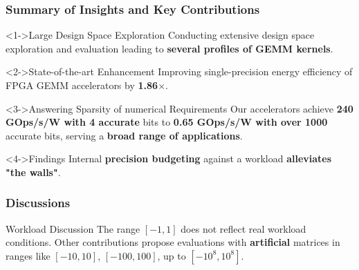 \begin{frame}
    \frametitle{Summary of Insights and Key Contributions}
        \begin{alertblock}<1->{Large Design Space Exploration}
		Conducting extensive design space exploration and evaluation leading to \textbf{several profiles of GEMM kernels}.
        \end{alertblock}
	\vspace{-3mm}

        \begin{block}<2->{State-of-the-art Enhancement}
		Improving single-precision energy efficiency of FPGA GEMM accelerators by \textbf{1.86$\times$}.
        \end{block}
	\vspace{-3mm}

        \begin{block}<3->{Answering Sparsity of numerical Requirements}
		Our accelerators achieve \textbf{240 GOps/s/W with 4 accurate} bits to \textbf{0.65 GOps/s/W with over 1000} accurate bits, serving a \textbf{broad range of applications}.
        \end{block}
	\vspace{-3mm}

        \begin{exampleblock}<4->{Findings}
		Internal \textbf{precision budgeting} against a workload \textbf{alleviates "the walls"}.
        \end{exampleblock}

\end{frame}
\begin{frame}
    \frametitle{Discussions}

   \begin{block}{Workload Discussion}
	   The range \([-1, 1]\) does not reflect real workload conditions. Other contributions propose evaluations with \textbf{artificial} matrices in ranges like \([-10, 10]\), \([-100, 100]\), up to \([-10^{8}, 10^{8}]\).
    \end{block}

\end{frame}
